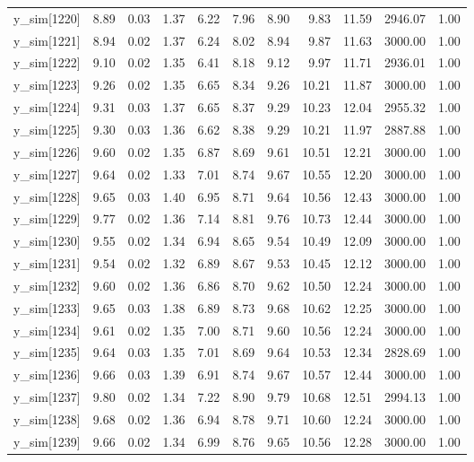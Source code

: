 \begin{table}[ht]
\begin{tabular}{rrrrrrrrrrr}
  y\_sim[1220] & 8.89 & 0.03 & 1.37 & 6.22 & 7.96 & 8.90 & 9.83 & 11.59 & 2946.07 & 1.00 \\ 
  y\_sim[1221] & 8.94 & 0.02 & 1.37 & 6.24 & 8.02 & 8.94 & 9.87 & 11.63 & 3000.00 & 1.00 \\ 
  y\_sim[1222] & 9.10 & 0.02 & 1.35 & 6.41 & 8.18 & 9.12 & 9.97 & 11.71 & 2936.01 & 1.00 \\ 
  y\_sim[1223] & 9.26 & 0.02 & 1.35 & 6.65 & 8.34 & 9.26 & 10.21 & 11.87 & 3000.00 & 1.00 \\ 
  y\_sim[1224] & 9.31 & 0.03 & 1.37 & 6.65 & 8.37 & 9.29 & 10.23 & 12.04 & 2955.32 & 1.00 \\ 
  y\_sim[1225] & 9.30 & 0.03 & 1.36 & 6.62 & 8.38 & 9.29 & 10.21 & 11.97 & 2887.88 & 1.00 \\ 
  y\_sim[1226] & 9.60 & 0.02 & 1.35 & 6.87 & 8.69 & 9.61 & 10.51 & 12.21 & 3000.00 & 1.00 \\ 
  y\_sim[1227] & 9.64 & 0.02 & 1.33 & 7.01 & 8.74 & 9.67 & 10.55 & 12.20 & 3000.00 & 1.00 \\ 
  y\_sim[1228] & 9.65 & 0.03 & 1.40 & 6.95 & 8.71 & 9.64 & 10.56 & 12.43 & 3000.00 & 1.00 \\ 
  y\_sim[1229] & 9.77 & 0.02 & 1.36 & 7.14 & 8.81 & 9.76 & 10.73 & 12.44 & 3000.00 & 1.00 \\ 
  y\_sim[1230] & 9.55 & 0.02 & 1.34 & 6.94 & 8.65 & 9.54 & 10.49 & 12.09 & 3000.00 & 1.00 \\ 
  y\_sim[1231] & 9.54 & 0.02 & 1.32 & 6.89 & 8.67 & 9.53 & 10.45 & 12.12 & 3000.00 & 1.00 \\ 
  y\_sim[1232] & 9.60 & 0.02 & 1.36 & 6.86 & 8.70 & 9.62 & 10.50 & 12.24 & 3000.00 & 1.00 \\ 
  y\_sim[1233] & 9.65 & 0.03 & 1.38 & 6.89 & 8.73 & 9.68 & 10.62 & 12.25 & 3000.00 & 1.00 \\ 
  y\_sim[1234] & 9.61 & 0.02 & 1.35 & 7.00 & 8.71 & 9.60 & 10.56 & 12.24 & 3000.00 & 1.00 \\ 
  y\_sim[1235] & 9.64 & 0.03 & 1.35 & 7.01 & 8.69 & 9.64 & 10.53 & 12.34 & 2828.69 & 1.00 \\ 
  y\_sim[1236] & 9.66 & 0.03 & 1.39 & 6.91 & 8.74 & 9.67 & 10.57 & 12.44 & 3000.00 & 1.00 \\ 
  y\_sim[1237] & 9.80 & 0.02 & 1.34 & 7.22 & 8.90 & 9.79 & 10.68 & 12.51 & 2994.13 & 1.00 \\ 
  y\_sim[1238] & 9.68 & 0.02 & 1.36 & 6.94 & 8.78 & 9.71 & 10.60 & 12.24 & 3000.00 & 1.00 \\ 
  y\_sim[1239] & 9.66 & 0.02 & 1.34 & 6.99 & 8.76 & 9.65 & 10.56 & 12.28 & 3000.00 & 1.00 \\ 

\end{tabular}
\end{table}
